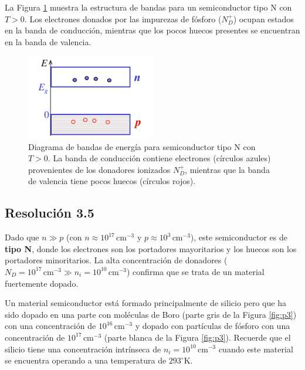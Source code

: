 \documentclass[
  11pt,
  letterpaper,
   addpoints,
  ]{exam}
\begin{document}
\begin{questions}
\begin{solution}
    La Figura \ref{fig:tipo_n} muestra la estructura de bandas para un semiconductor tipo N con $T > 0$. Los electrones donados por las impurezas de fósforo ($N_D^+$) ocupan estados en la banda de conducción, mientras que los pocos huecos presentes se encuentran en la banda de valencia.

    \begin{figure}[H]
        \centering
        \includegraphics[width=0.5\textwidth]{../figures/Auxiliar_2_6}
        \caption{Diagrama de bandas de energía para semiconductor tipo N con $T > 0$. La banda de conducción contiene electrones (círculos azules) provenientes de los donadores ionizados $N_D^+$, mientras que la banda de valencia tiene pocos huecos (círculos rojos).}
        \label{fig:tipo_n}
    \end{figure}

\subsection*{Resolución 3.5}

    Dado que $n \gg p$ (con $n \approx 10^{17}\,\mathrm{cm^{-3}}$ y $p \approx 10^{3}\,\mathrm{cm^{-3}}$), este semiconductor es de \textbf{tipo N}, donde los electrones son los portadores mayoritarios y los huecos son los portadores minoritarios. La alta concentración de donadores ($N_D = 10^{17}\,\mathrm{cm^{-3}} \gg n_i = 10^{10}\,\mathrm{cm^{-3}}$) confirma que se trata de un material fuertemente dopado.
\end{solution}
\question
Un material semiconductor está formado principalmente de silicio pero que ha sido dopado en una parte con moléculas de Boro (parte gris de la Figura \ref{fig:p3}) con una concentración de $10^{16}\,\text{cm}^{-3}$ y dopado con partículas de fósforo con una concentración de $10^{17}\,\text{cm}^{-3}$ (parte blanca de la Figura \ref{fig:p3}). Recuerde que el silicio tiene una concentración intrínseca de $n_i = 10^{10}\,\text{cm}^{-3}$ cuando este material se encuentra operando a una temperatura de $293^\circ \text{K}$.


\end{questions}
\end{document}
